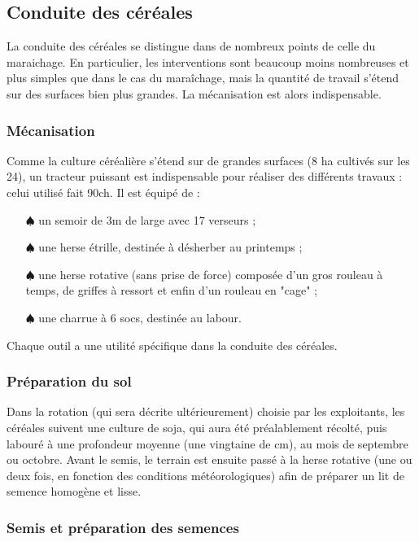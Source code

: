 \documentclass{article}
\begin{document}
\subsection{Conduite des céréales}

La conduite des céréales se distingue dans de nombreux points de celle du maraichage. En particulier, les interventions sont beaucoup moins nombreuses et plus simples que dans le cas du maraîchage, mais la quantité de travail s'étend sur des surfaces bien plus grandes. La mécanisation est alors indispensable.

\subsubsection*{Mécanisation}

Comme la culture céréalière s'étend sur de grandes surfaces (8 ha cultivés sur les 24), un tracteur puissant est indispensable pour réaliser des différents travaux : celui utilisé fait 90ch. Il est équipé de :
\begin{itemize}
	\item[$\spadesuit$] un semoir de 3m de large avec 17 verseurs ;
	\item[$\spadesuit$] une herse étrille, destinée à désherber au printemps ;
	\item[$\spadesuit$] une herse rotative (sans prise de force) composée d'un gros rouleau à temps, de griffes à ressort et enfin d'un rouleau en "cage" ;
	\item[$\spadesuit$] une charrue à 6 socs, destinée au labour.
\end{itemize}
Chaque outil a une utilité spécifique dans la conduite des céréales. 

\subsubsection*{Préparation du sol}

Dans la rotation (qui sera décrite ultérieurement) choisie par les exploitants, les céréales suivent une culture de soja, qui aura été préalablement récolté, puis labouré à une profondeur moyenne (une vingtaine de cm), au mois de septembre ou octobre. Avant le semis, le terrain est ensuite passé à la herse rotative (une ou deux fois, en fonction des conditions météorologiques) afin de préparer un lit de semence homogène et lisse.

\subsubsection*{Semis et préparation des semences}
\end{document}
